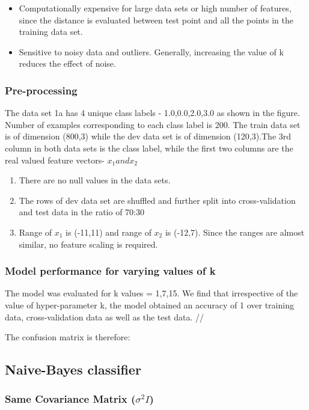\documentclass[11pt,a4paper]{article}
\begin{document}
\begin{itemize}
    \item Computationally expensive for large data sets or high number of features, since the distance is evaluated between test point and all the points in the training data set. 
    \item Sensitive to noisy data and outliers. Generally, increasing the value of k reduces the effect of noise.
\end{itemize}

\subsubsection{Pre-processing}

The data set 1a has 4 unique class labels - {1.0,0.0,2.0,3.0} as shown in the figure. Number of examples corresponding to each class label is 200.
The train data set is of dimension (800,3) while the dev data set is of dimension (120,3).The 3rd column in both data sets is the class label, while the first two columns are the real valued feature vectors- $x_{1} and x_{2}$
\begin{enumerate}
    \item There are no null values in the data sets. 
    \item The rows of dev data set are shuffled and further split into cross-validation and test data in the ratio of 70:30
    \item Range of $x_1$ is (-11,11) and range of $x_2$ is (-12,7). Since the ranges are almost similar, no feature scaling is required.  
\end{enumerate}

\subsubsection{Model performance for varying values of k}

The model was evaluated for k values = {1,7,15}. We find that irrespective of the value of hyper-parameter k, the model obtained an accuracy of 1 over training data, cross-validation data as well as the test data. //

The confusion matrix is therefore: 

\subsection{Naive-Bayes classifier}
\subsubsection{Same Covariance Matrix ($\sigma^2I$)}
\end{document}
